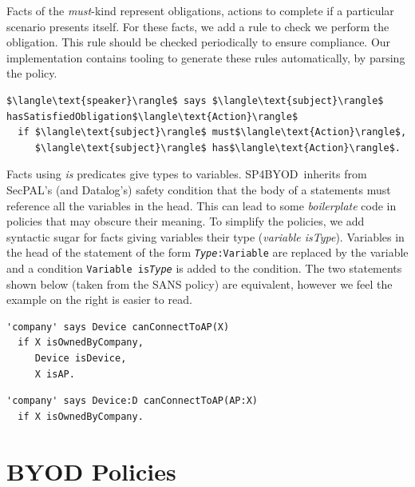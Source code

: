 \documentclass{llncs}
\newcommand{\AppPAL}[0]{SP4BYOD}
\begin{document}
Facts of the \emph{must}-kind represent obligations, actions to complete if a particular scenario presents itself.
For these facts, we add a rule to check we perform the obligation.
This rule should be checked periodically to ensure compliance.
Our implementation contains tooling to generate these rules automatically, by parsing the policy.
\begin{lstlisting}
$\langle\text{speaker}\rangle$ says $\langle\text{subject}\rangle$ hasSatisfiedObligation$\langle\text{Action}\rangle$
  if $\langle\text{subject}\rangle$ must$\langle\text{Action}\rangle$,
     $\langle\text{subject}\rangle$ has$\langle\text{Action}\rangle$.
\end{lstlisting}

Facts using \emph{is} predicates give types to variables. 
\AppPAL~inherits from SecPAL's (and Datalog's) safety condition that the body of a statements must reference all the variables in the head.
This can lead to some \emph{boilerplate} code in policies that may obscure their meaning.
To simplify the policies, we add syntactic sugar for facts giving variables their type (\emph{variable \emph{is}Type}).
Variables in the head of the statement of the form \texttt{\emph{Type}:Variable} are replaced by the variable and a condition \texttt{Variable is\emph{Type}} is added to the condition.
The two statements shown below (taken from the SANS policy) are equivalent, however we feel the example on the right is easier to read.

\begin{minipage}{\linewidth}
  \begin{minipage}{0.5\linewidth}
\begin{lstlisting}
'company' says Device canConnectToAP(X)
  if X isOwnedByCompany,
     Device isDevice,
     X isAP.
\end{lstlisting}
\end{minipage}
\begin{minipage}{0.5\linewidth}
\begin{lstlisting}
'company' says Device:D canConnectToAP(AP:X)
  if X isOwnedByCompany.
\end{lstlisting}
\end{minipage}
\end{minipage}

\section{BYOD Policies}
\label{ssec:byod-policies}
\end{document}
